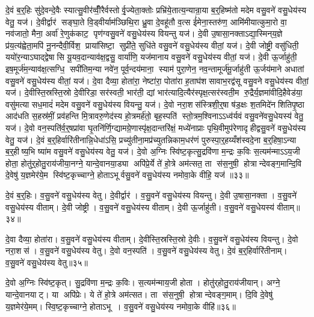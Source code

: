 दे॒वं ब॒र्॒हिः सु॑दे॒वन्दे॒वैः स्यात्सु॒वीर॑व्वीँ॒रैर्वस्तोर्वृ॒ज्येता॒क्तोः प्रभ्रि॑ये॒तात्य॒न्यान्रा॒या ब॒र्॒हिष्म॑तो मदेम वसु॒वने॑ वसु॒धेय॑स्य वेतु॒ यज॑। दे॒वीर्द्वार॑ सङ्घा॒ते वि॒ड्वीर्याम॑ञ्छिथि॒रा ध्रु॒वा दे॒वहू॑तौ व॒त्स ई॑मेना॒स्तरु॑ण॒ आमि॑मीयात्कुमा॒रो वा॒ नव॑जातो॒ मैना॒ अर्वा॑ रे॒णुक॑काट॒ पृण॑ग्वसु॒वने॑ वसु॒धेय॑स्य वियन्तु यज॑। दे॒वी उ॒षासा॒नक्ताऽद्या॒स्मिन्‌य॒ज्ञे प्र॑य॒त्य॑ह्वेता॒मपि॑ नू॒नन्दैवी॒र्विश॒ प्राया॑सिष्टा॒ सुप्री॑ते॒ सुधि॑ते वसु॒वने॑ वसु॒धेय॑स्य वीतां॒ यज॑। दे॒वी जोष्ट्री॒ वसु॑धिती॒ ययो॑र॒न्याऽघाद्द्वेषासि यू॒यव॒दान्याव॑क्ष॒द्वसु॒ वार्या॑णि॒ यज॑मानाय वसु॒वने॑ वसु॒धेय॑स्य वीतां॒ यज॑। दे॒वी ऊ॒र्जाहु॑ती॒ इष॒मूर्ज॑म॒न्याव॑क्ष॒त्सग्धि॒ सपी॑तिम॒न्या नवे॑न॒ पूर्व॒न्दय॑माना॒ स्याम॑ पुरा॒णेन॒ नव॒न्तामूर्ज॑मू॒र्जाहु॑ती ऊ॒र्जय॑माने अधातां वसु॒वने॑ वसु॒धेय॑स्य वीतां॒ यज॑। दे॒वा दैव्या॒ होता॑रा॒ नेष्टा॑रा॒ पोता॑रा ह॒ताघ॑शसावाभ॒रद्व॑सू वसु॒वने वसु॒धेय॑स्य वीतां॒ यज॑। दे॒वीस्ति॒स्रस्ति॒स्रो दे॒वीरिडा॒ सर॑स्वती॒ भार॑ती॒ द्यां भार॑त्यादि॒त्यैर॑स्पृक्ष॒त्सर॑स्वती॒म रु॒द्रैर्य॒ज्ञमा॑वीदि॒हैवेड॑या॒ वसु॑मत्या सध॒मादं॑ मदेम वसु॒वने॑ वसु॒धेय॑स्य वियन्तु॒ यज॑। दे॒वो नरा॒शस॑स्त्रिशी॒र्॒षा ष॑ड॒क्षः श॒तमिदे॑नशितिपृ॒ष्ठा आद॑धति स॒हस्र॑मीं॒ प्रव॑हन्ति मि॒त्रावरु॒णेद॑स्य हो॒त्रमर्\mbox{}ह॑तो॒ बृह॒स्पति॑ स्तो॒त्रम॒श्विनाऽऽध्व॑र्यवं वसु॒वने॑वसु॒धेयस्य॑ वेतु॒ यज॑। दे॒वो वन॒स्पति॑र्व॒र्॒षप्रा॑वा घृ॒तनि॑र्णि॒ग्द्यामग्रे॒णास्पृ॑क्ष॒दान्तरि॑क्षं॒ मध्ये॑नाप्राः पृथि॒वीमुप॑रेणादृहीद्वसु॒वने॑ वसु॒धेय॑स्य वेतु॒ यज॑। दे॒वं ब॒र्॒हिर्वारि॑तीनान्नि॒धेधा॑ऽसि॒ प्रच्यु॑तीना॒मप्र॑च्युतन्निकाम॒धर॑णं पुरुस्पा॒र्॒हय्यँश॑स्वदे॒ना ब॒र्॒हिषा॒ऽन्या ब॒र्॒हीष्य॒भि ष्या॑म वसु॒वने॑ वसु॒धेय॑स्य वेतु॒ यज॑। दे॒वो अ॒ग्निः स्वि॑ष्ट॒कृत्सु॒द्रवि॑णा म॒न्द्रः क॒विः स॒त्यम॑न्माऽऽय॒जी होता॒ होतु॑र्॒होतु॒राय॑जीया॒नग्ने॒ यान्दे॒वानया॒ड्या अपि॑प्रे॒र्ये ते॑ हो॒त्रे अम॑त्सत॒ ता स॑स॒नुषी॒ होत्रान्देवङ्ग॒मान्दि॒वि दे॒वेषु॑ य॒ज्ञमेर॑ये॒म स्वि॑ष्ट॒कृच्चाग्ने॒ होताऽभूर्वसु॒वने॑ वसु॒धेय॑स्य नमोवा॒के वीहि॒ यज॑ ॥३३॥\anuvakamend[यजैकं च]

दे॒वं ब॒र्॒हिः। व॒सु॒वने॑ वसु॒धेय॑स्य वेतु। दे॒वीर्द्वार॑। व॒सु॒वने॑ वसु॒धेय॑स्य वियन्तु। दे॒वी उ॒षासा॒नक्ता। व॒सु॒वने॑ वसु॒धेय॑स्य वीताम्। दे॒वी जोष्ट्री। व॒सु॒वने॑ वसु॒धेय॑स्य वीताम्। दे॒वी ऊ॒र्जाहु॑ती। व॒सु॒वने॑ वसु॒धेयस्य॑ वीताम्॥३४॥

दे॒वा दैव्या॒ होता॑रा। व॒सु॒वने॑ वसु॒धेय॑स्य वीताम्। दे॒वीस्ति॒स्रस्ति॒स्रो दे॒वीः। व॒सु॒वने॑ वसु॒धेय॑स्य वियन्तु। दे॒वो नरा॒शस॑। व॒सु॒वने॑ वसु॒धेय॑स्य वेतु। दे॒वो वन॒स्पति॑। व॒सु॒वने॑ वसु॒धेय॑स्य वेतु। दे॒वं ब॒र्॒हिर्वारि॑तीनाम्। व॒सु॒वने॑ वसु॒धेय॑स्य वेतु॥३५॥

दे॒वो अ॒ग्निः स्वि॑ष्ट॒कृत्। सु॒द्रवि॑णा म॒न्द्रः क॒विः। स॒त्यम॑न्माय॒जी होता। होतु॑र्‌होतु॒राय॑जीयान्। अग्ने॒ यान्दे॒वानयाट्। या अपि॑प्रेः। ये ते॑ हो॒त्रे अम॑त्सत। ता स॑स॒नुषी॒ होत्रान्देवङ्ग॒माम्। दि॒वि दे॒वेषु॑ य॒ज्ञमेर॑ये॒मम्। स्वि॒ष्ट॒कृच्चाग्ने॒ होताऽभू। व॒सु॒वने॑ वसु॒धेय॑स्य नमोवा॒के वीहि॑॥३६॥\anuvakamend[वी॒तां॒ वे॒त्वभू॒रेकं च]


